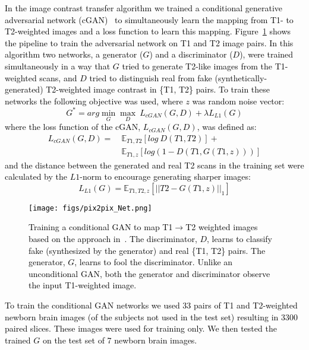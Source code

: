 \documentclass[journal,transmag]{IEEEtran}
\DeclareMathOperator*{\amin}{min}
\DeclareMathOperator*{\amax}{max}
\begin{document}
\textcolor{black}{In the image contrast transfer algorithm we trained a conditional generative adversarial network (cGAN)~\cite{isola2017image} to simultaneously learn the mapping from T1- to T2-weighted images and a loss function to learn this mapping. Figure~\ref{fig:T1toT2Net} shows the pipeline to train the adversarial network on T1 and T2 image pairs. In this algorithm two networks, a generator ($G$) and a discriminator ($D$), were trained simultaneously in a way that $G$ tried to generate T2-like images from the T1-weighted scans, and $D$ tried to distinguish real from fake (synthetically-generated) T2-weighted image contrast in \{T1, T2\} pairs. To train these networks the following objective was used, where $z$ was random noise vector:
\begin{equation}
    G^* = arg\amin_G\amax_D \ L_{cGAN}(G,D) + \lambda L_{L1}(G)
\end{equation}
where the loss function of the cGAN, $L_{cGAN}(G,D)$, was defined as:
\begin{equation}
\begin{split}
    L_{cGAN}(G,D) = \  & \mathbb{E}_{T1, T2}[log\ D(T1,T2)]+ \\ 
    & \mathbb{E}_{T1, z}[log(1-D(T1,G(T1,z)))]
\end{split}
\end{equation}
and the distance between the generated and real T2 scans in the training set were calculated by the $L1$-norm to encourage generating sharper images:
\begin{equation}
    L_{L1}(G) =  \mathbb{E}_{T1, T2, z}[||T2-G(T1,z)||_1]
\end{equation}
\begin{figure}
    \centering
    \texttt{[image: figs/pix2pix\_Net.png]}
    \caption{Training a conditional GAN to map T1$\rightarrow$T2 weighted images based on the approach in~\cite{isola2017image}. The discriminator, $D$, learns to classify fake (synthesized by the generator) and real \{T1, T2\} pairs. The generator, $G$, learns to fool the discriminator. Unlike an unconditional GAN, both the generator and discriminator observe the input T1-weighted image.}
    \label{fig:T1toT2Net}
\end{figure}
To train the conditional GAN networks we used 33 pairs of T1 and T2-weighted newborn brain images (of the subjects not used in the test set) resulting in 3300 paired slices. These images were used for training only. We then tested the trained $G$ on the test set of 7 newborn brain images.
}
\end{document}
